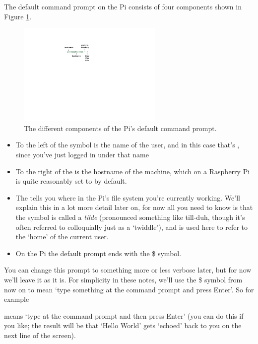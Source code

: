 The default command prompt on the Pi consists of four components shown in Figure \ref{figure:prompt}.

\begin{figure}
\centerline{\includegraphics[width=7cm]{images/default-prompt}}
\caption{The different components of the Pi's default command prompt.}\label{figure:prompt}
\end{figure}


\begin{itemize}
\item To the left of the  symbol is the name of the user, and in this case that's , since you've just logged in under that name
\item To the right of the  is the hostname of the machine, which on a Raspberry Pi is quite reasonably set to  by default.
\item The \texttildelow{} tells you where in the Pi's file system you're currently working. We'll explain this in a lot more detail later on, for now all you need to know is that the \texttildelow{} symbol is called a \textit{tilde} (pronounced something like till-duh, though it's often referred to colloquially just as a `twiddle'), and is used here to refer to the `home' of the current user. 
\item On the Pi the default prompt ends with the \$ symbol. 
\end{itemize}

You can change this prompt to something more or less verbose later, but for now we'll leave it as it is. For simplicity in these notes, we'll use the \$ symbol from now on to mean `type something at the command prompt and press Enter'. So for example


\noindent means `type  at the command prompt and then press Enter' (you can do this if you like; the result will be that `Hello World' gets `echoed' back to you on the next line of the screen). 

